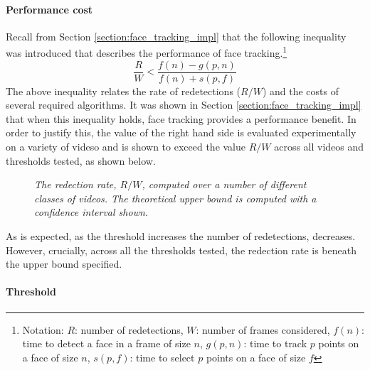 \paragraph{Performance cost}
Recall from Section \ref{section:face_tracking_impl} that the following inequality was introduced that describes the performance of face tracking.\footnote{Notation: $R$: number of redetections, $W$: number of frames considered, $f(n)$: time to detect a face in a frame of size $n$, $g(p,n)$: time to track $p$ points on a face of size $n$, $s(p,f)$: time to select $p$ points on a face of size $f$}
\begin{equation*}
    \frac{R}{W} < \frac{f(n)-g(p,n)}{f(n)+s(p,f)}
\end{equation*}
The above inequality relates the rate of redetections ($R/W$) and the costs of several required algorithms. It was shown in Section \ref{section:face_tracking_impl} that when this inequality holds, face tracking provides a performance benefit.
In order to justify this, the value of the right hand side is evaluated experimentally on a variety of videso and is shown to exceed the value $R/W$ across all videos and thresholds tested, as shown below.
\begin{figure}[H]
    \centering
    \scalebox{0.8}{}
   \caption{\textit{The redection rate, $R/W$, computed over a number of different classes of videos. The theoretical upper bound is computed with a confidence interval shown.}} 
\end{figure}
As is expected, as the threshold increases the number of redetections, decreases. However, crucially, across all the thresholds tested, the redection rate is beneath the upper bound specified.



\paragraph{Threshold}


